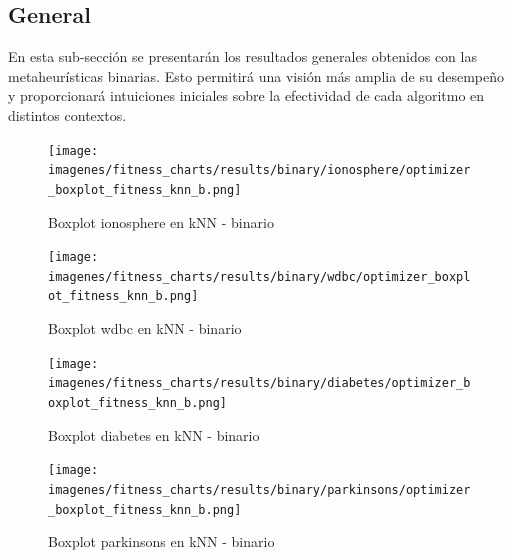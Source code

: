 \subsection{General}
En esta sub-sección se presentarán los resultados generales obtenidos con las metaheurísticas binarias. Esto permitirá una visión más amplia de su desempeño y proporcionará intuiciones iniciales sobre la efectividad de cada algoritmo en distintos contextos.

\begin{figure}[htp]
    \centering
    \texttt{[image: imagenes/fitness\_charts/results/binary/ionosphere/optimizer\_boxplot\_fitness\_knn\_b.png]}
    \caption{Boxplot ionosphere en kNN - binario}
    \label{fig:boxplot_ionosphere}
\end{figure}

\begin{figure}[htp]
    \centering
    \texttt{[image: imagenes/fitness\_charts/results/binary/wdbc/optimizer\_boxplot\_fitness\_knn\_b.png]}
    \caption{Boxplot wdbc en kNN - binario}
    \label{fig:boxplot_wdbc}
\end{figure}

\begin{figure}[htp]
    \centering
    \texttt{[image: imagenes/fitness\_charts/results/binary/diabetes/optimizer\_boxplot\_fitness\_knn\_b.png]}
    \caption{Boxplot diabetes en kNN - binario}
    \label{fig:boxplot_diabetes}
\end{figure}

\begin{figure}[htp]
    \centering
    \texttt{[image: imagenes/fitness\_charts/results/binary/parkinsons/optimizer\_boxplot\_fitness\_knn\_b.png]}
    \caption{Boxplot parkinsons en kNN - binario}
    \label{fig:boxplot_parkinsons}
\end{figure}

